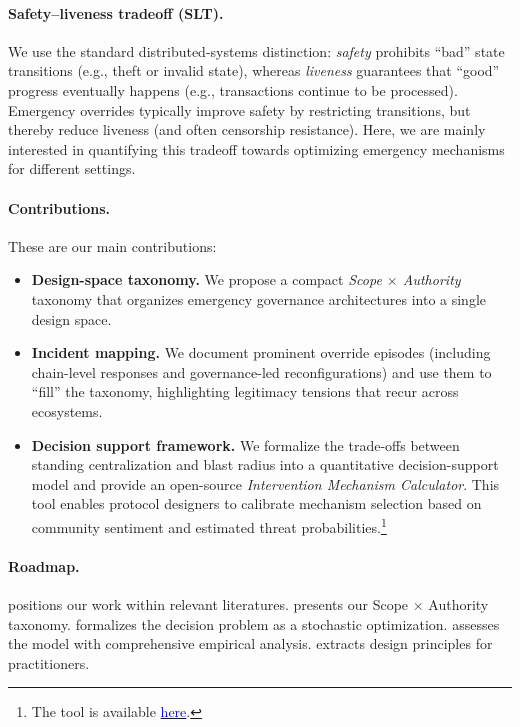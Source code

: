 \documentclass[12pt]{article}
\newif\ifconcise
\begin{document}
\paragraph{Safety--liveness tradeoff (SLT).}
We use the standard distributed-systems distinction: \emph{safety} prohibits ``bad'' state transitions (e.g., theft or invalid state),
whereas \emph{liveness} guarantees that ``good'' progress eventually happens (e.g., transactions continue to be processed).
Emergency overrides typically improve safety by restricting transitions, but thereby reduce liveness (and often censorship resistance).
Here, we are mainly interested in quantifying this tradeoff towards optimizing emergency mechanisms for different settings.

\paragraph{Contributions.}
These are our main contributions:
%
\begin{itemize}
    \item \textbf{Design-space taxonomy.} We propose a compact \emph{Scope $\times$ Authority} taxonomy that organizes emergency governance architectures
    into a single design space.
    \item \textbf{Incident mapping.} We document prominent override episodes (including chain-level responses and governance-led reconfigurations)
    and use them to ``fill'' the taxonomy, highlighting legitimacy tensions that recur across ecosystems.
    \item \textbf{Decision support framework.} We formalize the trade-offs between standing centralization and blast radius into a quantitative decision-support model and provide an open-source \emph{Intervention Mechanism Calculator}. 
    This tool enables protocol designers to calibrate mechanism selection based on community sentiment and estimated threat probabilities.\footnote{The tool is available \href{https://github.com/e3o8o/legitimate-overrides-paper/blob/main/notebooks/paper_analysis_complete.ipynb}{\textcolor{blue}{here}}.}
\end{itemize}


\ifconcise
\paragraph{Roadmap.}
 positions our work within relevant literatures.
 presents our Scope $\times$ Authority taxonomy.
 formalizes the decision problem as a stochastic optimization.
 assesses the model with comprehensive empirical analysis.
 extracts design principles for practitioners.
\else
\end{document}
